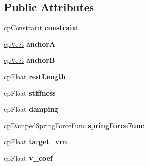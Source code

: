 \subsection*{Public Attributes}
\begin{DoxyCompactItemize}
\item 
\mbox{\label{structcpDampedSpring_aa24b79f6ccfa5b0891fe3092752888be}} 
\hyperlink{structcpConstraint}{cp\+Constraint} {\bfseries constraint}
\item 
\mbox{\label{structcpDampedSpring_afda1e8a59f2cd95c3faaa9411d252e9d}} 
\hyperlink{structcpVect}{cp\+Vect} {\bfseries anchorA}
\item 
\mbox{\label{structcpDampedSpring_a9c8f67e034e3c83b348d32ba2f4f0025}} 
\hyperlink{structcpVect}{cp\+Vect} {\bfseries anchorB}
\item 
\mbox{\label{structcpDampedSpring_ab61ca07cbe0ddd6f4379eb1fe364fa8b}} 
cp\+Float {\bfseries rest\+Length}
\item 
\mbox{\label{structcpDampedSpring_a6d40b21dc0ca0a57aecec6c517850f5f}} 
cp\+Float {\bfseries stiffness}
\item 
\mbox{\label{structcpDampedSpring_ac337d660f55f223ab0a1171ae630a0f2}} 
cp\+Float {\bfseries damping}
\item 
\mbox{\label{structcpDampedSpring_aa60f86823b89c951e6dff6defc3b5692}} 
\hyperlink{group__cpDampedSpring_gad88d8466e0057d4ad05183fb14fa274d}{cp\+Damped\+Spring\+Force\+Func} {\bfseries spring\+Force\+Func}
\item 
\mbox{\label{structcpDampedSpring_ae52d9c75dc9d5014c384144de1bb6055}} 
cp\+Float {\bfseries target\+\_\+vrn}
\item 
\mbox{\label{structcpDampedSpring_a75975322d892c943d987d214a7d9ea48}} 
cp\+Float {\bfseries v\+\_\+coef}
\item 
\mbox{\label{structcpDampedSpring_ab43b3ecbd18b7aadde8714805ab19cff}} 

\end{DoxyCompactItemize}
